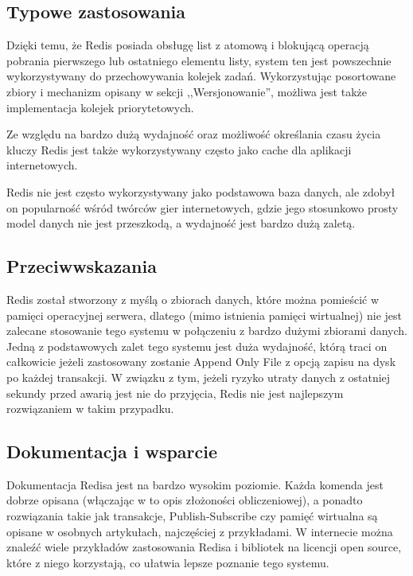 \subsection*{Typowe zastosowania}

Dzięki temu, że Redis posiada obsługę list z atomową i blokującą operacją pobrania pierwszego lub ostatniego elementu listy, system ten jest powszechnie wykorzystywany do przechowywania kolejek zadań.
Wykorzystując posortowane zbiory i mechanizm opisany w sekcji ,,Wersjonowanie'', możliwa jest także implementacja kolejek priorytetowych.

Ze względu na bardzo dużą wydajność oraz możliwość określania czasu życia kluczy Redis jest także wykorzystywany często jako cache dla aplikacji internetowych.

Redis nie jest często wykorzystywany jako podstawowa baza danych, ale zdobył on popularność wśród twórców gier internetowych, gdzie jego stosunkowo prosty model danych nie jest przeszkodą, a wydajność jest bardzo dużą zaletą.

\subsection*{Przeciwwskazania}

Redis został stworzony z myślą o zbiorach danych, które można pomieścić w pamięci operacyjnej serwera, dlatego (mimo istnienia pamięci wirtualnej) nie jest zalecane stosowanie tego systemu w połączeniu z bardzo dużymi zbiorami danych.
Jedną z podstawowych zalet tego systemu jest duża wydajność, którą traci on całkowicie jeżeli zastosowany zostanie Append Only File z opcją zapisu na dysk po każdej transakcji.
W związku z tym, jeżeli ryzyko utraty danych z ostatniej sekundy przed awarią jest nie do przyjęcia, Redis nie jest najlepszym rozwiązaniem w takim przypadku.

\subsection*{Dokumentacja i wsparcie}

Dokumentacja Redisa jest na bardzo wysokim poziomie.
Każda komenda jest dobrze opisana (włączając w to opis złożoności obliczeniowej), a ponadto rozwiązania takie jak transakcje, Publish-Subscribe czy pamięć wirtualna są opisane w osobnych artykułach, najczęściej z przykładami.
W internecie można znaleźć wiele przykładów zastosowania Redisa i bibliotek na licencji open source, które z niego korzystają, co ułatwia lepsze poznanie tego systemu.

